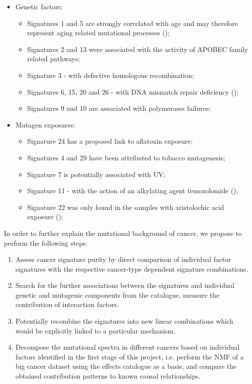 \begin{itemize}
\itemsep0em
\item Genetic factors:
  \begin{itemize}
  \itemsep0em
  \item Signatures 1 and 5 are strongly correlated with age and may therefore represent aging related mutational processes (\cite{Alex4});
  \item Signatures 2 and 13 were associated with the activity of APOBEC family related pathways;
  \item Signature 3 - with defective homologous recombination;
  \item Signatures 6, 15, 20 and 26 - with DNA mismatch repair deficiency (\cite{MMR});
  \item Signatures 9 and 10 are associated with polymerases failures;
  \end{itemize}
\item Mutagen exposures:
  \begin{itemize}
  \itemsep0em
  \item Signature 24 has a proposed link to aflatoxin exposure;
  \item Signatures 4 and 29 have been attributed to tobacco mutagenesis;
  \item Signature 7 is potentially associated with UV;
  \item Signature 11 - with the action of an alkylating agent temozolomide (\cite{Poon1});
  \item Signature 22 was only found in the samples with aristolochic acid exposure (\cite{Poon2});
  \end{itemize}
\end{itemize}

In order to further explain the mutational background of cancer, we propose to perform the following steps:

\begin{enumerate}
\item Assess cancer signature purity by direct comparison of individual factor signatures with the respective cancer-type dependent signature combinations.
\item Search for the further associations between the signatures and individual genetic and mutagenic components from the catalogue, measure the contribution of interaction factors.
\item Potentially recombine the signatures into new linear combinations which would be explicitly linked to a particular mechanism.
\item Decompose the mutational spectra in different cancers based on individual factors identified in the first stage of this project, i.e. perform the NMF of a big cancer dataset using the effects catalogue as a basis, and compare the obtained contribution patterns to known causal relationships.
\end{enumerate}

